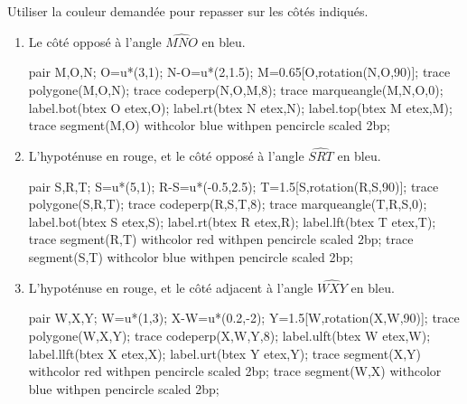 \begin{corrige}
    Utiliser la couleur demandée pour repasser sur les côtés indiqués.
    \begin{enumerate}
        \item Le côté opposé à l'angle $\widehat{MNO}$ en bleu.
        
        \medskip        
        \begin{Geometrie}[CoinHD={(6u,4.5u)}]        
            pair M,O,N;
            O=u*(3,1);
            N-O=u*(2,1.5);
            M=0.65[O,rotation(N,O,90)];
            trace polygone(M,O,N);            
            trace codeperp(N,O,M,8);        
            trace marqueangle(M,N,O,0);
            label.bot(btex O etex,O);
            label.rt(btex N etex,N);
            label.top(btex M etex,M);
            trace segment(M,O) withcolor blue withpen pencircle scaled 2bp;
        \end{Geometrie}
        \item L'hypoténuse en rouge, et le côté opposé à l'angle $\widehat{SRT}$ en bleu.
        
        \medskip        
        \begin{Geometrie}[CoinHD={(6u,4.5u)}]        
            pair S,R,T;
            S=u*(5,1);
            R-S=u*(-0.5,2.5);
            T=1.5[S,rotation(R,S,90)];
            trace polygone(S,R,T);
            trace codeperp(R,S,T,8);        
            trace marqueangle(T,R,S,0);
            label.bot(btex S etex,S);
            label.rt(btex R etex,R);
            label.lft(btex T etex,T);
            trace segment(R,T) withcolor red withpen pencircle scaled 2bp;
            trace segment(S,T) withcolor blue withpen pencircle scaled 2bp;
        \end{Geometrie}        
        \item L'hypoténuse en rouge, et le côté adjacent à l'angle $\widehat{WXY}$ en bleu.
        
        \medskip        
        \begin{Geometrie}[CoinHD={(6u,4.5u)}]        
            pair W,X,Y;
            W=u*(1,3);
            X-W=u*(0.2,-2);
            Y=1.5[W,rotation(X,W,90)];
            trace polygone(W,X,Y);            
            trace codeperp(X,W,Y,8);
            label.ulft(btex W etex,W);
            label.llft(btex X etex,X);
            label.urt(btex Y etex,Y);
            trace segment(X,Y) withcolor red withpen pencircle scaled 2bp;
            trace segment(W,X) withcolor blue withpen pencircle scaled 2bp;
        \end{Geometrie}
    \end{enumerate}
\end{corrige}


